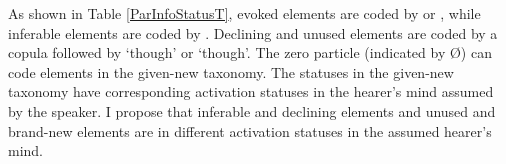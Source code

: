 As shown in Table \ref{ParInfoStatusT},
evoked elements are coded by  or ,
while inferable elements are coded by .
Declining and unused elements are coded by a copula followed by  `though' or  `though'.
The zero particle (indicated by {\O}) can code elements in the given-new taxonomy.
The statuses in the given-new taxonomy have corresponding activation statuses in the hearer's mind assumed by the speaker.
I propose that inferable and declining elements and unused and brand-new elements are in different activation statuses in the assumed hearer's mind.

